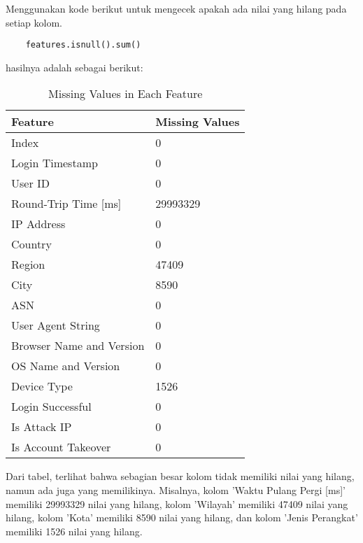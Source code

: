 Menggunakan kode berikut untuk mengecek apakah ada nilai yang hilang pada setiap kolom.
\begin{lstlisting}
    features.isnull().sum()
    \end{lstlisting}

hasilnya adalah sebagai berikut:

\begin{table}[H]
    \caption{Missing Values in Each Feature}
    \centering
    \begin{tabular}{|l|l|}
    \hline
    \textbf{Feature} & \textbf{Missing Values} \\ \hline
    Index & 0 \\ 
    Login Timestamp & 0 \\ 
    User ID & 0 \\ 
    Round-Trip Time [ms] & 29993329 \\ 
    IP Address & 0 \\ 
    Country & 0 \\ 
    Region & 47409 \\ 
    City & 8590 \\ 
    ASN & 0 \\ 
    User Agent String & 0 \\ 
    Browser Name and Version & 0 \\ 
    OS Name and Version & 0 \\ 
    Device Type & 1526 \\ 
    Login Successful & 0 \\ 
    Is Attack IP & 0 \\ 
    Is Account Takeover & 0 \\ \hline
    \end{tabular}
    \label{tab:missing_values}
    \end{table}

Dari tabel, terlihat bahwa sebagian besar kolom tidak memiliki nilai yang hilang, namun ada juga yang memilikinya. Misalnya, kolom 'Waktu Pulang Pergi [ms]' memiliki 29993329 nilai yang hilang, kolom 'Wilayah' memiliki 47409 nilai yang hilang, kolom 'Kota' memiliki 8590 nilai yang hilang, dan kolom 'Jenis Perangkat' memiliki 1526 nilai yang hilang.
